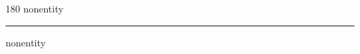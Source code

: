 
\begin{frame}
\begin{center}
\begin{turn}{180}
{\fontsize{2.5cm}{1em}\selectfont nonentity}
\end{turn}
\vspace{1em}\par  
\hrule
\vspace{1em}\par  
{\fontsize{2.5cm}{1em}\selectfont nonentity}
\end{center}
\end{frame}
